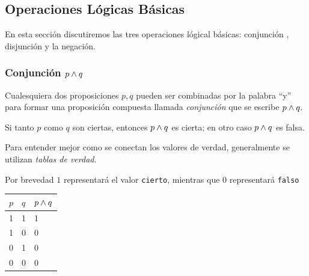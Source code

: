 \documentclass[xcolor={svgnames},
  hyperref={colorlinks}, 
  spanish, 12pt]{beamer}
\numberwithin{equation}{section} %
\numberwithin{figure}{section} %
\begin{document}
\subsection{Operaciones L\'ogicas B\'asicas}

\begin{frame}
    En esta secci\'on discutiremos las tres operaciones l\'ogical b\'asicas: conjunci\'on , disjunci\'on  y la negaci\'on.
\end{frame}

\subsubsection{Conjunci\'on $p \wedge q$}

\begin{frame}
    Cualesquiera dos proposiciones $p,q$ pueden ser combinadas por la palabra ``y'' para formar una proposici\'on compuesta llamada \emph{conjunci\'on} que se escribe $p\wedge q.$
\end{frame}

\begin{frame}
    \begin{defn}
        Si tanto $p$ como $q$ son ciertas, entonces $p \wedge q$ es cierta; en otro caso $p\wedge q$ es falsa.
    \end{defn}
    
\end{frame}

\begin{frame}
    \begin{rem}
        Para entender mejor como se conectan los valores de verdad, generalmente se utilizan \emph{tablas de verdad.} \pause 
        
        Por brevedad $1$ representar\'a el valor \texttt{cierto}, mientras que $0$ representar\'a \texttt{falso}
    \end{rem}
    
\end{frame}

\begin{frame}
    \begin{tdv}[Conjunci\'on]
        \label{tdv:and}
        \begin{center}
            \begin{tabular}{|l|l|l|}\hline
                $p$ & $q$ & $p \wedge q$\\\hline
                1 & 1 & 1\\\hline
                1 & 0 & 0\\\hline
                0 & 1 & 0\\\hline
                0 & 0 & 0\\\hline
            \end{tabular}
        \end{center}
        
    \end{tdv}
    
\end{frame}
\end{document}
